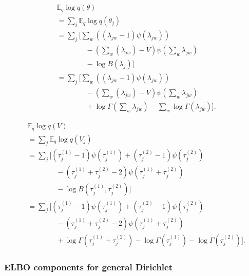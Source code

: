 \documentclass{article}
\newcommand{\Eq}{\ensuremath{\mathbb{E}_q\xspace}}
\begin{document}
\begin{align*}
    &\Eq \log q\left(\theta\right) \\
    &= \sum_j \Eq \log q\left(\theta_j\right) \\
    &= \sum_j \Bigg[ \sum_w{\left(\left(\lambda_{jw} - 1\right) \psi\left(\lambda_{jw}\right)\right)} \\
    &\qquad\qquad - \left(\sum_{w}{\left(\lambda_{jw}\right)} - V\right) \psi\left(\sum_{w} \lambda_{jw}\right) \\
    &\qquad\qquad - \log B\left(\lambda_j\right) \Bigg] \\
    &= \sum_j \Bigg[ \sum_w{\left(\left(\lambda_{jw} - 1\right) \psi\left(\lambda_{jw}\right)\right)} \\
    &\qquad\qquad - \left(\sum_{w}{\left(\lambda_{jw}\right)} - V\right) \psi\left(\sum_{w} \lambda_{jw}\right) \\
    &\qquad\qquad + \log \Gamma\left(\sum_w \lambda_{jw}\right) - \sum_w \log \Gamma\left(\lambda_{jw}\right) \Bigg] .
\end{align*}

\begin{align*}
    &\Eq \log q\left(V\right) \\
    &= \sum_j \Eq \log q\left(V_j\right) \\
    &= \sum_j \Bigg[ (\tau_j^{(1)} - 1) \psi\left(\tau_j^{(1)}\right) + (\tau_j^{(2)} - 1) \psi\left(\tau_j^{(2)}\right) \\
    &\qquad\qquad - (\tau_j^{(1)} + \tau_j^{(2)} - 2) \psi\left(\tau_j^{(1)} + \tau_j^{(2)}\right) \\
    &\qquad\qquad - \log B\left(\tau_j^{(1)}, \tau_j^{(2)}\right) \Bigg] \\
    &= \sum_j \Bigg[ (\tau_j^{(1)} - 1) \psi\left(\tau_j^{(1)}\right) + (\tau_j^{(2)} - 1) \psi\left(\tau_j^{(2)}\right) \\
    &\qquad\qquad - (\tau_j^{(1)} + \tau_j^{(2)} - 2) \psi\left(\tau_j^{(1)} + \tau_j^{(2)}\right) \\
    &\qquad\qquad + \log \Gamma\left(\tau_j^{(1)} + \tau_j^{(2)}\right) - \log\Gamma\left(\tau_j^{(1)}\right) - \log\Gamma\left(\tau_j^{(2)}\right) \Bigg] .
\end{align*}


\subsubsection*{ELBO components for general Dirichlet}
\end{document}
